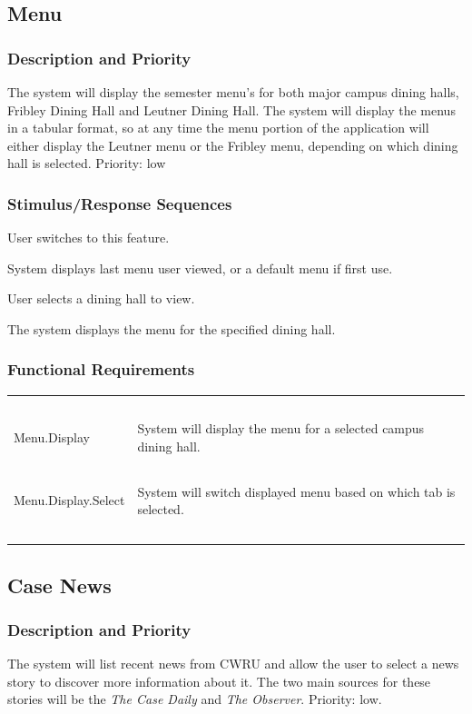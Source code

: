 \documentclass[pdftex,12pt,letter]{article}
\begin{document}
\subsection{Menu}
\subsubsection{Description and Priority}
The system will display the semester menu's for both major campus dining halls, Fribley Dining Hall and Leutner Dining Hall. The system will display the menus in a tabular format, so at any time the menu portion of the application will either display the Leutner menu or the Fribley menu, depending on which dining hall is selected. Priority: low
\subsubsection{Stimulus/Response Sequences}
\begin{description}\itemsep1pt
\item[Stimulus:] User switches to this feature.
\item[Response:] System displays last menu user viewed, or a default menu if first use.
\item[Stimulus:] User selects a dining hall to view.
\item[Response:] The system displays the menu for the specified dining hall.
\end{description}
\subsubsection{Functional Requirements}
\begin{table}[!h]
\begin{tabularx}{\textwidth }[t]{|l Y|}
\hline
~&~\\
Menu.Display & System will display the menu for a selected campus dining hall.\\ 
~&~\\
Menu.Display.Select & System will switch displayed menu based on which tab is selected.\\
~&~\\
\hline
\end{tabularx}
\end{table}
\FloatBarrier
\subsection{Case News}
\subsubsection{Description and Priority}
The system will list recent news from CWRU and allow the user to select a news story to discover more information about it. The two main sources for these stories will be the \emph{The Case Daily} and \emph{The Observer}. Priority: low.
\end{document}
